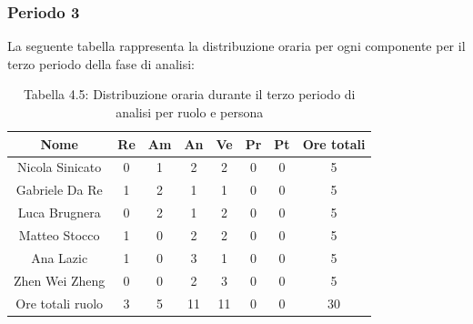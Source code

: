\subsubsection{Periodo 3}
%
La seguente tabella rappresenta la distribuzione oraria per ogni componente per il terzo periodo della fase di analisi:
\begin{table}[h]
	\setlength\extrarowheight{5pt}
	\centering
	\begin{tabularx}{\textwidth}{|ccccccc|c|}
		\hline
		\rowcolor{white}
		\textbf{Nome} & \textbf{Re} & \textbf{Am} & \textbf{An} & \textbf{Ve} & \textbf{Pr}& \textbf{Pt} & \textbf{Ore totali} \\
		\hline
		Nicola Sinicato &0&1&2&2&0&0&5 \\
		Gabriele Da Re &1&2&1&1&0&0&5 \\
		Luca Brugnera &0&2&1&2&0&0&5 \\
		Matteo Stocco &1&0&2&2&0&0&5 \\
		Ana Lazic &1&0&3&1&0&0&5 \\
		Zhen Wei Zheng &0&0&2&3&0&0&5 \\
		\hline
		Ore totali ruolo &3&5&11&11&0&0&30 \\
		\hline
	\end{tabularx}
	\vspace{10pt}
	\caption{Tabella 4.5: Distribuzione oraria durante il terzo periodo di analisi per ruolo e persona}
\end{table}

